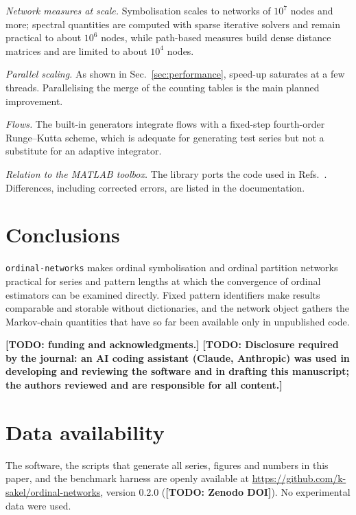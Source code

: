 \documentclass[aip,cha,reprint,amsmath,amssymb]{revtex4-2}
\newcommand{\pkg}{\texttt{ordinal-networks}}
\newcommand{\TODO}[1]{\textbf{[TODO: #1]}}
\begin{document}
\emph{Network measures at scale.} Symbolisation scales to networks of $10^7$ nodes and
more; spectral quantities are computed with sparse iterative solvers and remain
practical to about $10^6$ nodes, while path-based measures build dense distance
matrices and are limited to about $10^4$ nodes.

\emph{Parallel scaling.} As shown in Sec.~\ref{sec:performance}, speed-up saturates at
a few threads. Parallelising the merge of the counting tables is the main planned
improvement.

\emph{Flows.} The built-in generators integrate flows with a fixed-step fourth-order
Runge--Kutta scheme, which is adequate for generating test series but not a substitute
for an adaptive integrator.

\emph{Relation to the MATLAB toolbox.} The library ports the code used in
Refs.~. Differences, including corrected
errors, are listed in the documentation.

\section{Conclusions}

\pkg{} makes ordinal symbolisation and ordinal partition networks practical for series
and pattern lengths at which the convergence of ordinal estimators can be examined
directly. Fixed pattern identifiers make results comparable and storable without
dictionaries, and the network object gathers the Markov-chain quantities that have so
far been available only in unpublished code.

\begin{acknowledgments}
\TODO{funding and acknowledgments.} \TODO{Disclosure required by the journal: an AI
coding assistant (Claude, Anthropic) was used in developing and reviewing the software
and in drafting this manuscript; the authors reviewed and are responsible for all
content.}
\end{acknowledgments}

\section*{Data availability}

The software, the scripts that generate all series, figures and numbers in this paper,
and the benchmark harness are openly available at
\url{https://github.com/k-sakel/ordinal-networks}, version 0.2.0
(\TODO{Zenodo DOI}). No experimental data were used.


\end{document}
